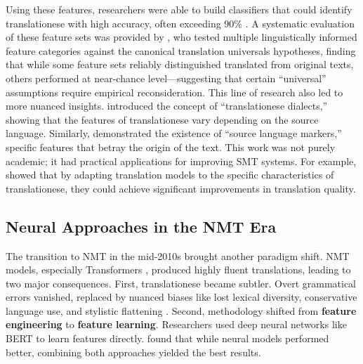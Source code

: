 \documentclass[11pt,a4paper]{article}
\begin{document}
Using these features, researchers were able to build classifiers that could identify translationese with high accuracy, often exceeding 90\% \cite{baroni2006new}. A systematic evaluation of these feature sets was provided by \citet{volansky2015features}, who tested multiple linguistically informed feature categories against the canonical translation universals hypotheses, finding that while some feature sets reliably distinguished translated from original texts, others performed at near-chance level---suggesting that certain ``universal'' assumptions require empirical reconsideration. This line of research also led to more nuanced insights. \citet{koppel2011translationese} introduced the concept of ``translationese dialects,'' showing that the features of translationese vary depending on the source language. Similarly, \citet{van2008source} demonstrated the existence of ``source language markers,'' specific features that betray the origin of the text. This work was not purely academic; it had practical applications for improving SMT systems. For example, \citet{lembersky2013improving} showed that by adapting translation models to the specific characteristics of translationese, they could achieve significant improvements in translation quality.

\subsection{Neural Approaches in the NMT Era}

The transition to NMT in the mid-2010s brought another paradigm shift. NMT models, especially Transformers \cite{vaswani2017attention}, produced highly fluent translations, leading to two major consequences. First, translationese became subtler. Overt grammatical errors vanished, replaced by nuanced biases like lost lexical diversity, conservative language use, and stylistic flattening \cite{vanmassenhove2018getting}. Second, methodology shifted from \textbf{feature engineering} to \textbf{feature learning}. Researchers used deep neural networks like BERT to learn features directly. \citet{pylypenko2021comparing} found that while neural models performed better, combining both approaches yielded the best results.
\end{document}
